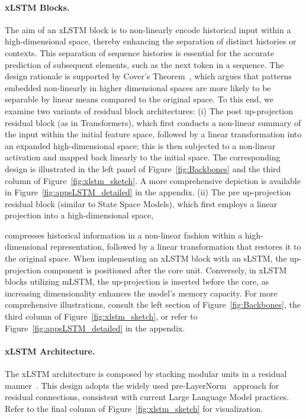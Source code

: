\paragraph{xLSTM Blocks.}
\label{sec:xLSTMblock}
The aim of an xLSTM block is to non-linearly encode historical input within a high-dimensional space, thereby enhancing the separation of distinct histories or contexts. This separation of sequence histories is essential for the accurate prediction of subsequent elements, such as the next token in a sequence. The design rationale is supported by Cover’s Theorem~\citep{Cover:65}, which argues that patterns embedded non-linearly in higher dimensional spaces are more likely to be separable by linear means compared to the original space. To this end, we examine two variants of residual block architectures: (i) The post up-projection residual block (as in Transformers), which first conducts a non-linear summary of the input within the initial feature space, followed by a linear transformation into an expanded high-dimensional space; this is then subjected to a non-linear activation and mapped back linearly to the initial space. The corresponding design is illustrated in the left panel of Figure~\ref{fig:Backbones}
and the third column of Figure~\ref{fig:xlstm_sketch}. 
A more comprehensive depiction is available in Figure~\ref{fig:appsLSTM_detailed}
in the appendix. (ii) The pre up-projection residual block (similar to State Space Models), which first employs a linear projection into a high-dimensional space,

compresses historical information in a non-linear fashion within a high-dimensional representation, followed by a linear transformation that restores it to the original space. When implementing an xLSTM block with an sLSTM, the up-projection component is positioned after the core unit. Conversely, in xLSTM blocks utilizing mLSTM, the up-projection is inserted before the core, as increasing dimensionality enhances the model's memory capacity. For more comprehensive illustrations, consult the left section of Figure~\ref{fig:Backbones}, the third column of Figure~\ref{fig:xlstm_sketch}, or refer to Figure~\ref{fig:appsLSTM_detailed} in the appendix.

\paragraph{xLSTM Architecture. }
\label{sec:xLSTMarchitecure}
The xLSTM architecture is composed by stacking modular units in a residual manner~\citep{Srivastava:15,He:16}. This design adopts the widely used pre-LayerNorm~\citep{Ba:16b} approach for residual connections, consistent with current Large Language Model practices. Refer to the final column of Figure~\ref{fig:xlstm_sketch} for visualization.

